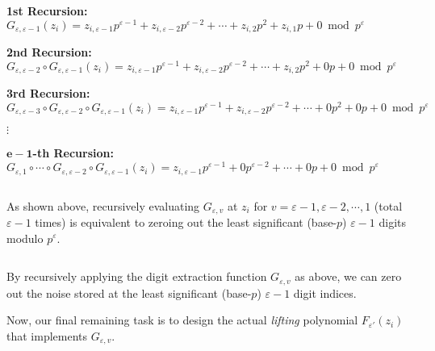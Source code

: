 \textbf{1st Recursion:} $G_{\varepsilon,\varepsilon-1}(z_i) = z_{i, \varepsilon-1}p^{\varepsilon-1} + z_{i, \varepsilon-2}p^{\varepsilon-2} + \cdots + z_{i, 2}p^2 + z_{i, 1}p + 0 \bmod p^\varepsilon$

\textbf{2nd Recursion:} $G_{\varepsilon,\varepsilon-2} \circ G_{\varepsilon,\varepsilon-1}(z_i) = z_{i, \varepsilon-1}p^{\varepsilon-1} + z_{i, \varepsilon-2}p^{\varepsilon-2} + \cdots + z_{i, 2}p^2 + 0p + 0 \bmod p^\varepsilon$

\textbf{3rd Recursion:} $G_{\varepsilon,\varepsilon-3} \circ G_{\varepsilon,\varepsilon-2} \circ G_{\varepsilon,\varepsilon-1}(z_i) = z_{i, \varepsilon-1}p^{\varepsilon-1} + z_{i, \varepsilon-2}p^{\varepsilon-2} + \cdots + 0p^2 + 0p + 0 \bmod p^\varepsilon$

$\vdots$

\textbf{$\bm{e-1}$-th Recursion:} $G_{\varepsilon,1} \circ \cdots \circ G_{\varepsilon,\varepsilon-2} \circ G_{\varepsilon,\varepsilon-1}(z_i) = z_{i, \varepsilon-1}p^{\varepsilon-1} + 0p^{\varepsilon-2} + \cdots + 0p + 0 \bmod p^\varepsilon$

$ $

As shown above, recursively evaluating $G_{\varepsilon, v}$ at $z_i$ for $v = \varepsilon-1, \varepsilon-2, \cdots, 1$ (total $\varepsilon-1$ times) is equivalent to zeroing out the least significant (base-$p$) $\varepsilon-1$ digits modulo $p^\varepsilon$. 






$ $

By recursively applying the digit extraction function $G_{\varepsilon,v}$ as above, we can zero out the noise stored at the least significant (base-$p$) $\varepsilon-1$ digit indices. 

Now, our final remaining task is to design the actual \textit{lifting} polynomial $F_{\varepsilon'}(z_i)$ that implements $G_{\varepsilon,v}$.  

